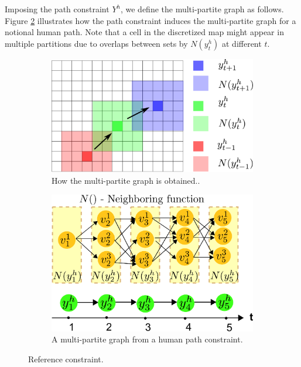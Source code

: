 \documentclass[phd]{byuprop}
\begin{document}
Imposing the path constraint $ Y^{h} $, we define the multi-partite graph as follows.
Figure \ref{fig:MultiPartite} illustrates how the path constraint induces the multi-partite graph for a notional human path.
Note that a cell in the discretized map might appear in multiple partitions due to overlaps between sets by $ N( y^{h}_{t} ) $ at different $ t $.


\begin{figure}[htbp]
	\centering
	\begin{subfigure}[t]{0.45\linewidth}
		\centering
		\includegraphics[width=\textwidth]{fig/humanConstraint.pdf}
		\caption{How the multi-partite graph is obtained..}
		\label{fig:humanConstraint}
	\end{subfigure}  
	\begin{subfigure}[t]{0.45\linewidth}
		\centering
		\includegraphics[width=\textwidth]{fig/MultiPartite.pdf}
		\caption{A multi-partite graph from a human path constraint.}
		\label{fig:MultiPartite}
	\end{subfigure}   
	\caption{Reference constraint.}
	\label{fig:reference_constraint}
\end{figure}
\end{document}
